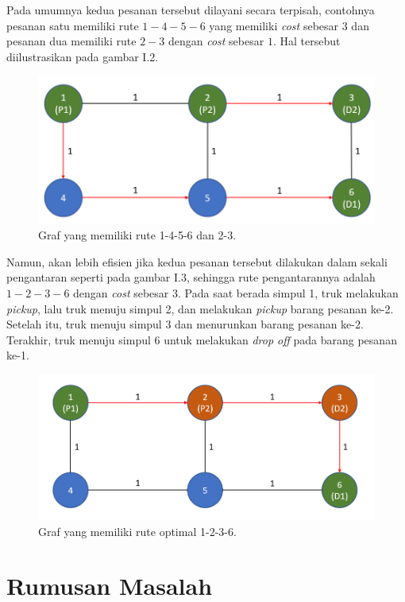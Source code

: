 Pada umumnya kedua pesanan tersebut dilayani secara terpisah, contohnya pesanan satu memiliki rute $1-4-5-6$ 
yang memiliki \textit{cost} sebesar $3$ dan pesanan dua memiliki rute $2-3$ dengan \textit{cost} sebesar $1$. 
Hal tersebut diilustrasikan pada gambar I.2.

\begin{figure}[H]
    \centering
    \includegraphics[width=1.0\textwidth]{resources/graph_routes.png}
    \caption{Graf yang memiliki rute 1-4-5-6 dan 2-3.}
\end{figure}

Namun, akan lebih efisien jika kedua pesanan tersebut dilakukan dalam sekali pengantaran seperti pada gambar I.3, sehingga 
rute pengantarannya adalah $1-2-3-6$ dengan \textit{cost} sebesar $3$.
Pada saat berada simpul 1, truk melakukan \textit{pickup}, lalu truk menuju simpul 2, dan melakukan \textit{pickup} barang pesanan ke-2. Setelah itu, truk menuju simpul 3
dan menurunkan barang pesanan ke-2. Terakhir, truk menuju simpul 6  untuk melakukan \textit{drop off} pada barang pesanan ke-1.

\begin{figure}[H]
    \centering
    \includegraphics[width=1.0\textwidth]{resources/graph_optimal.png}
    \caption{Graf yang memiliki rute optimal 1-2-3-6.}
\end{figure}

\section{Rumusan Masalah}

